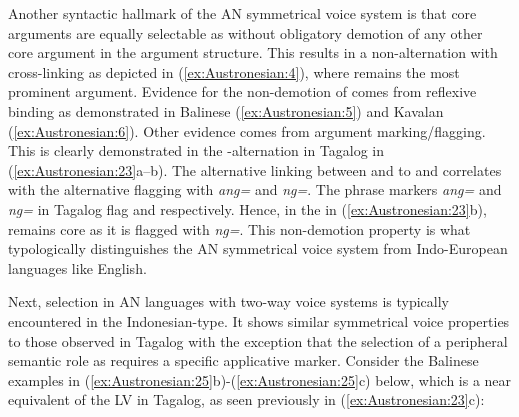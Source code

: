 \documentclass[output=paper,chinesefont]{../langscibook}
\begin{document}
Another syntactic hallmark of the AN symmetrical voice system is that core arguments are equally selectable as \SUBJ without obligatory demotion of any other core argument in the argument structure. This results in a non-\AV alternation with cross-linking as depicted in (\ref{ex:Austronesian:4}), where  remains the most prominent argument. Evidence for the non-demotion of  comes from reflexive binding as demonstrated in Balinese (\ref{ex:Austronesian:5}) and Kavalan (\ref{ex:Austronesian:6}). Other evidence comes from argument marking/flagging. This is clearly demonstrated in the \AV-\PV alternation in Tagalog in (\ref{ex:Austronesian:23}a--b). The alternative linking between  and  to \SUBJ and \OBJ correlates with the alternative flagging with \emph{ang=} and \emph{ng=}. The phrase markers \emph{ang=} and \emph{ng=} in Tagalog flag \SUBJ and \OBJ respectively. Hence, in the \PV in (\ref{ex:Austronesian:23}b),  remains core as it is flagged with \emph{ng=}. This non-demotion property is what typologically distinguishes the AN symmetrical voice system from Indo-European languages like English.

Next, \SUBJ selection in AN languages with two-way voice systems is typically encountered in the Indonesian-type. It shows similar symmetrical voice properties to those observed in Tagalog with the exception that the selection of a peripheral semantic role as \SUBJ requires a specific applicative marker. Consider the Balinese examples in (\ref{ex:Austronesian:25}b)-(\ref{ex:Austronesian:25}c) below, which is a near equivalent of the LV in Tagalog, as seen previously in (\ref{ex:Austronesian:23}c): 
\end{document}
